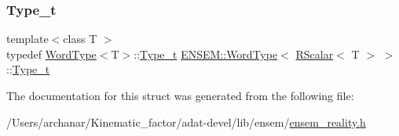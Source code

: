 \subsubsection{\texorpdfstring{Type\_t}{Type\_t}\hspace{0.1cm}{\footnotesize\ttfamily [3/3]}}
{\footnotesize\ttfamily template$<$class T $>$ \\
typedef \mbox{\hyperlink{structENSEM_1_1WordType}{Word\+Type}}$<$T$>$\+::\mbox{\hyperlink{structENSEM_1_1WordType_3_01RScalar_3_01T_01_4_01_4_a348d1b21435dcb68c291fefa3ae5c20c}{Type\+\_\+t}} \mbox{\hyperlink{structENSEM_1_1WordType}{E\+N\+S\+E\+M\+::\+Word\+Type}}$<$ \mbox{\hyperlink{classENSEM_1_1RScalar}{R\+Scalar}}$<$ T $>$ $>$\+::\mbox{\hyperlink{structENSEM_1_1WordType_3_01RScalar_3_01T_01_4_01_4_a348d1b21435dcb68c291fefa3ae5c20c}{Type\+\_\+t}}}



The documentation for this struct was generated from the following file\+:\begin{DoxyCompactItemize}
\item 
/\+Users/archanar/\+Kinematic\+\_\+factor/adat-\/devel/lib/ensem/\mbox{\hyperlink{adat-devel_2lib_2ensem_2ensem__reality_8h}{ensem\+\_\+reality.\+h}}\end{DoxyCompactItemize}
